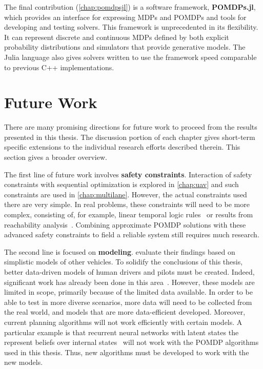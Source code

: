 The final contribution (\cref{chap:pomdpsjl}) is a software framework, \textbf{POMDPs.jl}, which provides an interface for expressing MDPs and POMDPs and tools for developing and testing solvers.
This framework is unprecedented in its flexibility.
It can represent discrete and continuous MDPs defined by both explicit probability distributions and simulators that provide generative models.
The Julia language also gives solvers written to use the framework speed comparable to previous C++ implementations.

\section{Future Work}

There are many promising directions for future work to proceed from the results presented in this thesis.
The discussion portion of each chapter gives short-term specific extensions to the individual research efforts described therein.
This section gives a broader overview.

The first line of future work involves \textbf{safety constraints}.
Interaction of safety constraints with sequential optimization is explored in \cref{chap:uav} and such constraints are used in \cref{chap:multilane}.
However, the actual constraints used there are very simple.
In real problems, these constraints will need to be more complex, consisting of, for example, linear temporal logic rules~\cite{sadigh2016safe} or results from reachability analysis~\cite{chen2015exact}.
Combining approximate POMDP solutions with these advanced safety constraints to field a reliable system still requires much research.

The second line is focused on \textbf{modeling}.  evaluate their findings based on simplistic models of other vehicles.
To solidify the conclusions of this thesis, better data-driven models of human drivers and pilots must be created.
Indeed, significant work has already been done in this area~\cite{schmerling2018multimodal,bhattacharyya2018multi}. 
However, these models are limited in scope, primarily because of the limited data available.
In order to be able to test in more diverse scenarios, more data will need to be collected from the real world, and models that are more data-efficient developed.
Moreover, current planning algorithms will not work efficiently with certain models.
A particular example is that recurrent neural networks with latent states the represent beliefs over internal states~\cite{schmerling2018multimodal} will not work with the POMDP algorithms used in this thesis.
Thus, new algorithms must be developed to work with the new models.

